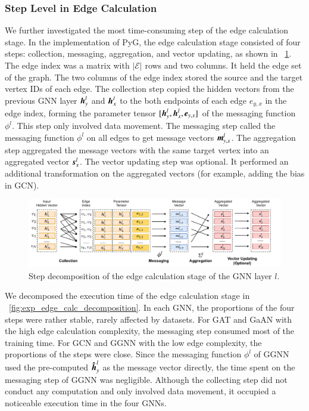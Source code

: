 \subsubsection{Step Level in Edge Calculation}

We further investigated the most time-consuming step of the edge calculation stage.
%
In the implementation of PyG, the edge calculation stage consisted of four steps: collection, messaging, aggregation, and vector updating, as shown in \figurename~\ref{fig:steps_in_edge_calculation}.
%
The edge index was a matrix with $|\mathcal{E}|$ rows and two columns.
%
It held the edge set of the graph.
%
The two columns of the edge index stored the source and the target vertex IDs of each edge.
%
The collection step copied the hidden vectors from the previous GNN layer $\boldsymbol{h}^l_y$ and $\boldsymbol{h}^l_x$ to the both endpoints of each edge $e_{y,x}$ in the edge index, forming the parameter tensor $[\boldsymbol{h}^l_{y}, \boldsymbol{h}^l_{x}, \boldsymbol{e}_{y,x}]$ of the messaging function $\phi^l$.
%
This step only involved data movement.
%
The messaging step called the messaging function $\phi^l$ on all edges to get message vectors $\boldsymbol{m}^l_{y,x}$.
%
The aggregation step aggregated the message vectors with the same target vertex into an aggregated vector $\boldsymbol{s}^l_x$.
%
The vector updating step was optional.
%
It performed an additional transformation on the aggregated vectors (for example, adding the bias in GCN).

\begin{figure}[H]
    \centering
    \includegraphics[width=1\columnwidth]{figs/illustration/steps_in_edge_calculation.pdf}
    \caption{Step decomposition of the edge calculation stage of the GNN layer $l$.}
    \label{fig:steps_in_edge_calculation}
\end{figure}

We decomposed the execution time of the edge calculation stage in \figurename~\ref{fig:exp_edge_calc_decomposition}.
%
In each GNN, the proportions of the four steps were rather stable, rarely affected by datasets. 
%
For GAT and GaAN with the high edge calculation complexity, the messaging step consumed most of the training time. 
%
For GCN and GGNN with the low edge complexity, the proportions of the steps were close. 
%
Since the messaging function $\phi^l$ of GGNN used the pre-computed $\boldsymbol{\hat{h}}^l_y$ as the message vector directly, the time spent on the messaging step of GGNN was negligible.
%
Although the collecting step did not conduct any computation and only involved data movement, it occupied a noticeable execution time in the four GNNs.

